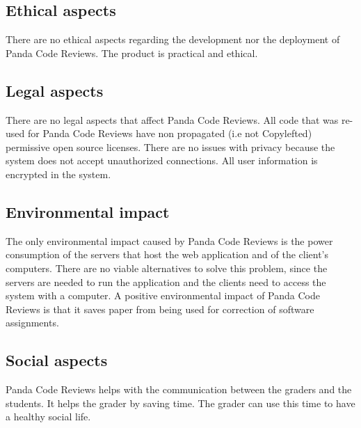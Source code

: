 \subsection{Ethical aspects}
There are no ethical aspects regarding the development nor the deployment of Panda Code Reviews. The product is practical and ethical.

\subsection{Legal aspects}
There are no legal aspects that affect Panda Code Reviews. All code that was re-used for
Panda Code Reviews have non propagated (i.e not Copylefted) permissive open source licenses.
There are no issues with privacy because the system does not accept unauthorized connections. All user information is encrypted in the system.

\subsection{Environmental impact}
The only environmental impact caused by Panda Code Reviews is the power consumption of the
servers that host the web application and of the client's computers. There are no viable
alternatives to solve this problem, since the servers are needed to run the application and
the clients need to access the system with a computer. A positive environmental impact of
Panda Code Reviews is that it saves paper from being used for correction of software
assignments.

\subsection{Social aspects}
Panda Code Reviews helps with the communication between the graders and the students. It
helps the grader by saving time. The grader can use this time to have a healthy social life.

